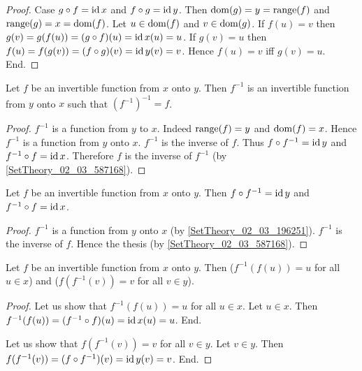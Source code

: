 \documentclass[../../sets-and-functions.ftl.tex]{subfiles}
\begin{document}
\begin{forthel}
\begin{proof}
      Case $g \circ f = \operatorname{id}{x}$ and $f \circ g = \operatorname{id}{y}$.
        Then $\operatorname{dom}(g) = y = \operatorname{range}(f)$ and $\operatorname{range}(g) = x = \operatorname{dom}(f)$.
        Let $u \in \operatorname{dom}(f)$ and $v \in \operatorname{dom}(g)$.
        If $f(u) = v$ then $g(v) = g(f(u)) = (g \circ f)(u) = \operatorname{id}{x}(u) = u$.
        If $g(v) = u$ then $f(u) = f(g(v)) = (f \circ g)(v) = \operatorname{id}{y}(v) = v$.
        Hence $f(u) = v$ iff $g(v) = u$.
      End.
    \end{proof}

    \begin{proposition}\label{SetTheory_02_03_196251}
      Let $f$ be an invertible function from $x$ onto $y$.
      Then $f^{-1}$ is an invertible function from $y$ onto $x$ such that $(f^{-1})^{-1} = f$.
    \end{proposition}
    \begin{proof}
      $f^{-1}$ is a function from $y$ to $x$.
      Indeed $\operatorname{range}(f) = y$ and $\operatorname{dom}(f) = x$.
      Hence $f^{-1}$ is a function from $y$ onto $x$.
      $f^{-1}$ is the inverse of $f$.
      Thus $f \circ f^{-1} = \operatorname{id}{y}$ and $f^{-1} \circ f = \operatorname{id}{x}$.
      Therefore $f$ is the inverse of $f^{-1}$ (by \ref{SetTheory_02_03_587168}).
    \end{proof}

    \begin{proposition}\label{SetTheory_02_03_601485}
      Let $f$ be an invertible function from $x$ onto $y$.
      Then $f \circ f^{-1} = \operatorname{id}{y}$ and $f^{-1} \circ f = \operatorname{id}{x}$.
    \end{proposition}
    \begin{proof}
      $f^{-1}$ is a function from $y$ onto $x$ (by \ref{SetTheory_02_03_196251}).
      $f^{-1}$ is the inverse of $f$.
      Hence the thesis (by \ref{SetTheory_02_03_587168}).
    \end{proof}

    \begin{proposition}\label{SetTheory_02_03_173329}
      Let $f$ be an invertible function from $x$ onto $y$.
      Then ($f^{-1}(f(u)) = u$ for all $u \in x$) and ($f(f^{-1}(v)) = v$ for all $v \in y$).
    \end{proposition}
    \begin{proof}
      Let us show that  $f^{-1}(f(u)) = u$ for all $u \in x$.
        Let $u \in x$.
        Then $f^{-1}(f(u)) = (f^{-1} \circ f)(u) = \operatorname{id}{x}(u) = u$.
      End.

      Let us show that $f(f^{-1}(v)) = v$ for all $v \in y$.
        Let $v \in y$.
        Then $f(f^{-1}(v)) = (f \circ f^{-1})(v) = \operatorname{id}{y}(v) = v$.
      End.
    \end{proof}


\end{forthel}
\end{document}
